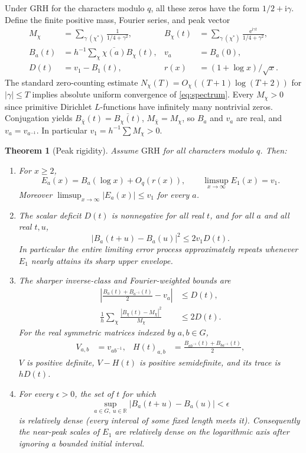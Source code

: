 \documentclass[11pt]{article}
\newtheorem{theorem}{Theorem}[section]
\theoremstyle{remark}\newtheorem{remark}[theorem]{Remark}
\newcommand{\e}{\mathrm{e}}
\newcommand{\ii}{\mathrm{i}}
\newcommand{\GRH}{\mathrm{GRH}}
\begin{document}
Under $\GRH$ for the characters modulo $q$, all these zeros have the form $1/2+\ii\gamma$. Define the finite positive mass, Fourier series, and peak vector
\begin{align}
 M_\chi&=\sum_{\gamma\ (\chi^*)} \frac1{1/4+\gamma^2},&
 B_\chi(t)&=\sum_{\gamma\ (\chi^*)}\frac{\e^{\ii\gamma t}}{1/4+\gamma^2},\label{eq:spectrum}\\
 B_a(t)&=h^{-1}\sum_\chi\overline{\chi(a)}B_\chi(t),&
 v_a&=B_a(0),\nonumber\\
 D(t)&=v_1-B_1(t),& r(x)&=(1+\log x)/\sqrt{x}.\label{eq:deficit}
\end{align}
The standard zero-counting estimate $N_\chi(T)=O_\chi((T+1)\log(T+2))$ for $|\gamma|\le T$ implies absolute uniform convergence of \eqref{eq:spectrum}. Every $M_\chi>0$ since primitive Dirichlet $L$-functions have infinitely many nontrivial zeros. Conjugation yields $B_{\bar\chi}(t)=\overline{B_\chi(t)}$, $M_{\bar\chi}=M_\chi$, so $B_a$ and $v_a$ are real, and $v_a=v_{a^{-1}}$. In particular $v_1=h^{-1}\sum M_\chi>0$.

\begin{theorem}[Peak rigidity]\label{thm:main}
Assume $\GRH$ for all characters modulo $q$. Then:
\begin{enumerate}
\item For $x\ge2$,
\begin{equation}\label{eq:approx}
 E_a(x)=B_a(\log x)+O_q(r(x)),\qquad
 \limsup_{x\to\infty} E_1(x)=v_1.
\end{equation}
Moreover $\limsup_{x\to\infty}|E_a(x)|\le v_1$ for every $a$.
\item The scalar deficit $D(t)$ is nonnegative for all real $t$, and for all $a$ and all real $t,u$,
\begin{equation}\label{eq:translate}
 \boxed{\ |B_a(t+u)-B_a(u)|^2\le 2v_1 D(t).\ }
\end{equation}
In particular the entire limiting error process approximately repeats whenever $E_1$ nearly attains its sharp upper envelope.
\item The sharper inverse-class and Fourier-weighted bounds are
\begin{align}
 \left|\frac{B_a(t)+B_{a^{-1}}(t)}2-v_a\right|&\le D(t),\label{eq:linear}\\
 \frac1h\sum_\chi\frac{|B_\chi(t)-M_\chi|^2}{M_\chi}&\le 2D(t).\label{eq:ellipsoid}
\end{align}
For the real symmetric matrices indexed by $a,b\in G$,
\begin{align*}
 V_{a,b}&=v_{ab^{-1}},& H(t)_{a,b}&=\frac{B_{ab^{-1}}(t)+B_{ba^{-1}}(t)}2,
\end{align*}
$V$ is positive definite, $V-H(t)$ is positive semidefinite, and its trace is $hD(t)$.
\item For every $\epsilon>0$, the set of $t$ for which
\[
 \sup_{a\in G,\ u\in\mathbb R}|B_a(t+u)-B_a(u)|<\epsilon
\]
is relatively dense (every interval of some fixed length meets it). Consequently the near-peak scales of $E_1$ are relatively dense on the logarithmic axis after ignoring a bounded initial interval.
\end{enumerate}
\end{theorem}
\end{document}
